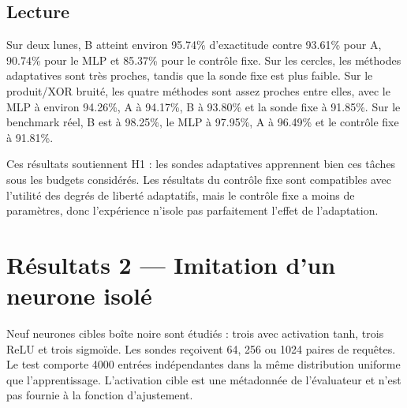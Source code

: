 \documentclass[11pt,a4paper]{article}
\begin{document}
\subsection{Lecture}
Sur deux lunes, B atteint environ 95.74\% d'exactitude contre 93.61\% pour A, 90.74\% pour le MLP et 85.37\% pour le contrôle fixe. Sur les cercles, les méthodes adaptatives sont très proches, tandis que la sonde fixe est plus faible. Sur le produit/XOR bruité, les quatre méthodes sont assez proches entre elles, avec le MLP à environ 94.26\%, A à 94.17\%, B à 93.80\% et la sonde fixe à 91.85\%. Sur le benchmark réel, B est à 98.25\%, le MLP à 97.95\%, A à 96.49\% et le contrôle fixe à 91.81\%.

Ces résultats soutiennent H1 : les sondes adaptatives apprennent bien ces tâches sous les budgets considérés. Les résultats du contrôle fixe sont compatibles avec l'utilité des degrés de liberté adaptatifs, mais le contrôle fixe a moins de paramètres, donc l'expérience n'isole pas parfaitement l'effet de l'adaptation.

\section{Résultats 2 — Imitation d'un neurone isolé}
Neuf neurones cibles boîte noire sont étudiés : trois avec activation tanh, trois ReLU et trois sigmoïde. Les sondes reçoivent 64, 256 ou 1024 paires de requêtes. Le test comporte 4000 entrées indépendantes dans la même distribution uniforme que l'apprentissage. L'activation cible est une métadonnée de l'évaluateur et n'est pas fournie à la fonction d'ajustement.
\end{document}
